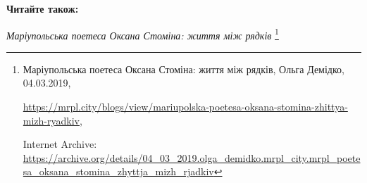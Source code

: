  
 
 
 
 


\textbf{Читайте також:}\par\noindent\emph{Маріупольська поетеса Оксана Стоміна: життя між рядків}
\footnote{Маріупольська поетеса Оксана Стоміна: життя між рядків, Ольга Демідко, 04.03.2019, \par%
\url{https://mrpl.city/blogs/view/mariupolska-poetesa-oksana-stomina-zhittya-mizh-ryadkiv}, \par%
Internet Archive: \url{https://archive.org/details/04_03_2019.olga_demidko.mrpl_city.mrpl_poetesa_oksana_stomina_zhyttja_mizh_rjadkiv}}

